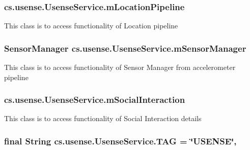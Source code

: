 \subsubsection[{m\+Location\+Pipeline}]{ cs.\+usense.\+Usense\+Service.\+m\+Location\+Pipeline\hspace{0.3cm}{\ttfamily [private]}}\label{classcs_1_1usense_1_1_usense_service_a9233b9b84371bc77c397123c28f54f32}
This class is to access functionality of Location pipeline \hypertarget{classcs_1_1usense_1_1_usense_service_ab93d0af2a257379caa8406afd31f070e}{}
\subsubsection[{m\+Sensor\+Manager}]{\setlength{\rightskip}{0pt plus 5cm}Sensor\+Manager cs.\+usense.\+Usense\+Service.\+m\+Sensor\+Manager\hspace{0.3cm}{\ttfamily [private]}}\label{classcs_1_1usense_1_1_usense_service_ab93d0af2a257379caa8406afd31f070e}
This class is to access functionality of Sensor Manager from accelerometer pipeline \hypertarget{classcs_1_1usense_1_1_usense_service_a5f5920a5da11e00ac573b18f3be7c351}{}
\subsubsection[{m\+Social\+Interaction}]{ cs.\+usense.\+Usense\+Service.\+m\+Social\+Interaction\hspace{0.3cm}{\ttfamily [private]}}\label{classcs_1_1usense_1_1_usense_service_a5f5920a5da11e00ac573b18f3be7c351}
This class is to access functionality of Social Interaction details \hypertarget{classcs_1_1usense_1_1_usense_service_a2f4af137278818b3b651b780cad78960}{}
\subsubsection[{T\+A\+G}]{\setlength{\rightskip}{0pt plus 5cm}final String cs.\+usense.\+Usense\+Service.\+T\+A\+G = \char`\"{}U\+S\+E\+N\+S\+E\char`\"{}\hspace{0.3cm}{\ttfamily [static]}, {\ttfamily [private]}}\label{classcs_1_1usense_1_1_usense_service_a2f4af137278818b3b651b780cad78960}
\hypertarget{classcs_1_1usense_1_1_usense_service_a2840167e746fe3e7184721310b75f31d}{}
